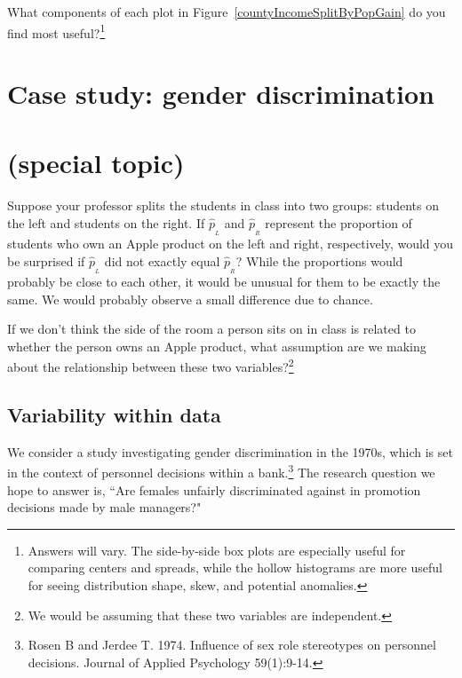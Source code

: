 \begin{exercise}
What components of each plot in Figure~\ref{countyIncomeSplitByPopGain} do you find most useful?\footnote{Answers will vary. The side-by-side box plots are especially useful for comparing centers and spreads, while the hollow histograms are more useful for seeing distribution shape, skew, and potential anomalies.}
\end{exercise}



\section[Case study: gender discrimination (special topic)]{Case study: gender discrimination ~ \\(special topic)}
\label{caseStudyGenderDiscrimination}


\begin{example}{Suppose your professor splits the students in class into two groups: students on the left and students on the right. If $\hat{p}_{_L}$ and $\hat{p}_{_R}$ represent the proportion of students who own an Apple product on the left and right, respectively, would you be surprised if $\hat{p}_{_L}$ did not {exactly} equal $\hat{p}_{_R}$?}\label{classRightLeftSideApple}
While the proportions would probably be close to each other, it would be unusual for them to be exactly the same. We would probably observe a small difference due to {chance}.
\end{example}

\begin{exercise}
If we don't think the side of the room a person sits on in class is related to whether the person owns an Apple product, what assumption are we making about the relationship between these two variables?\footnote{We would be assuming that these two variables are independent.}
\end{exercise}

\subsection{Variability within data}
\label{variabilityWithinData}

We consider a study investigating gender discrimination in the 1970s, which is set in the context of personnel decisions within a bank.\footnote{Rosen B and Jerdee T. 1974. Influence of sex role stereotypes on personnel decisions. Journal of Applied Psychology 59(1):9-14.} The research question we hope to answer is, ``Are females unfairly discriminated against in promotion decisions made by male managers?"

